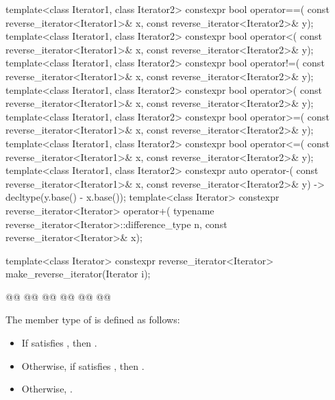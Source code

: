 \begin{codeblock}
{  template<class Iterator1, class Iterator2>
    constexpr bool operator==(
      const reverse_iterator<Iterator1>& x,
      const reverse_iterator<Iterator2>& y);
  template<class Iterator1, class Iterator2>
    constexpr bool operator<(
      const reverse_iterator<Iterator1>& x,
      const reverse_iterator<Iterator2>& y);
  template<class Iterator1, class Iterator2>
    constexpr bool operator!=(
      const reverse_iterator<Iterator1>& x,
      const reverse_iterator<Iterator2>& y);
  template<class Iterator1, class Iterator2>
    constexpr bool operator>(
      const reverse_iterator<Iterator1>& x,
      const reverse_iterator<Iterator2>& y);
  template<class Iterator1, class Iterator2>
    constexpr bool operator>=(
      const reverse_iterator<Iterator1>& x,
      const reverse_iterator<Iterator2>& y);
  template<class Iterator1, class Iterator2>
    constexpr bool operator<=(
      const reverse_iterator<Iterator1>& x,
      const reverse_iterator<Iterator2>& y);
  template<class Iterator1, class Iterator2>
    constexpr auto operator-(
      const reverse_iterator<Iterator1>& x,
      const reverse_iterator<Iterator2>& y) -> decltype(y.base() - x.base());
  template<class Iterator>
    constexpr reverse_iterator<Iterator> operator+(
      typename reverse_iterator<Iterator>::difference_type n,
      const reverse_iterator<Iterator>& x);

  template<class Iterator>
    constexpr reverse_iterator<Iterator> make_reverse_iterator(Iterator i);

  @@
    @@
      @@
    @@
                                          @@
  @\added{\}}@
}
\end{codeblock}

\begin{addedblock}
\pnum
The member type  of  is
defined as follows:
\begin{itemize}
\item If  satisfies , then
.
\item Otherwise, if  satisfies , then
.
\item Otherwise, .
\end{itemize}
\end{addedblock}


